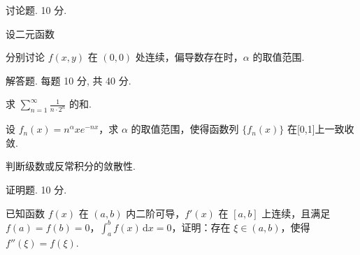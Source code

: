 讨论题. 10 分.\par
\par{}
设二元函数\par
\nopagebreak[4]
分别讨论 $f(x,y)$ 在 $(0,0)$ 处连续，偏导数存在时，$\alpha$ 的取值范围.\par
\par{}
解答题. 每题 10 分, 共 40 分.\par
求 $\sum_{n=1}^{\infty} \frac{1}{n \cdot 2^n}$ 的和.\par
设 $f_{n}(x) = n^{\alpha}xe^{-nx}$，求 $\alpha$ 的取值范围，使得函数列 $\{f_n(x)\}$ 在[0,1]上一致收敛.\par
\par{}
判断级数或反常积分的敛散性.\par
\nopagebreak[4]
\par{}
证明题. 10 分.\par
已知函数 $f(x)$ 在 $(a,b)$ 内二阶可导，$f'(x)$ 在 $[a,b]$ 上连续，且满足 $f(a) = f(b) = 0$，$\int_{a}^{b} f(x) \, \mathrm{d}x = 0$，证明：存在 $\xi \in (a,b)$，使得 $f''(\xi) = f(\xi)$.\par
